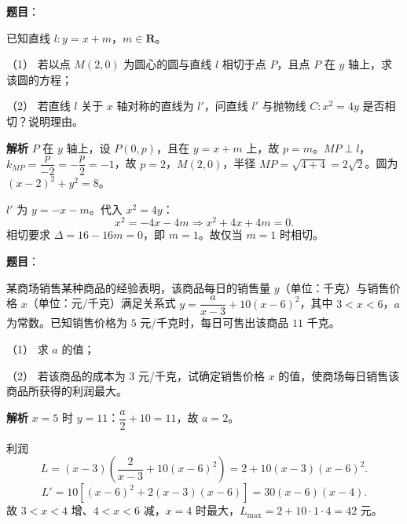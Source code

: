 \begin{answer}

\textbf{题目}：

已知直线 $l:y=x+m$，$m\in\mathbf R$。

（1） 若以点 $M(2,0)$ 为圆心的圆与直线 $l$ 相切于点 $P$，且点 $P$ 在 $y$ 轴上，求该圆的方程；

（2） 若直线 $l$ 关于 $x$ 轴对称的直线为 $l'$，问直线 $l'$ 与抛物线 $C:x^2=4y$ 是否相切？说明理由。

\textbf{解析}
$P$ 在 $y$ 轴上，设 $P(0,p)$，且在 $y=x+m$ 上，故 $p=m$。$MP\perp l$，$k_{MP}=\dfrac{p}{-2}=-\dfrac p2=-1$，故 $p=2$，$M(2,0)$，半径 $MP=\sqrt{4+4}=2\sqrt2$。圆为 $(x-2)^2+y^2=8$。

$l'$ 为 $y=-x-m$。代入 $x^2=4y$：
\nopagebreak[4]
\[x^2=-4x-4m\Longrightarrow x^2+4x+4m=0.\]
相切要求 $\Delta=16-16m=0$，即 $m=1$。故仅当 $m=1$ 时相切。



\end{answer}
\begin{answer}

\textbf{题目}：

某商场销售某种商品的经验表明，该商品每日的销售量 $y$（单位：千克）与销售价格 $x$（单位：元/千克）满足关系式 $y=\dfrac a{x-3}+10(x-6)^2$，其中 $3<x<6$，$a$ 为常数。已知销售价格为 $5$ 元/千克时，每日可售出该商品 $11$ 千克。

（1） 求 $a$ 的值；

（2） 若该商品的成本为 $3$ 元/千克，试确定销售价格 $x$ 的值，使商场每日销售该商品所获得的利润最大。

\textbf{解析}
$x=5$ 时 $y=11$：$\dfrac a2+10=11$，故 $a=2$。

利润
\nopagebreak[4]
\[L=(x-3)\left(\frac2{x-3}+10(x-6)^2\right)=2+10(x-3)(x-6)^2.\]
\nopagebreak[4]
\[L'=10\left[(x-6)^2+2(x-3)(x-6)\right]=30(x-6)(x-4).\]
故 $3<x<4$ 增、$4<x<6$ 减，$x=4$ 时最大，$L_{\max}=2+10\cdot1\cdot4=42$ 元。



\end{answer}
